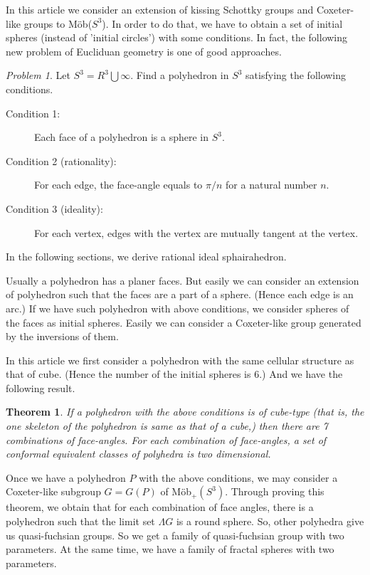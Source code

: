 \documentclass[dvipdfmx]{interact}
\theoremstyle{plain}%
\newtheorem{theorem}{Theorem}[section]
\theoremstyle{definition}
\theoremstyle{remark}
\theoremstyle{problemstyle}
\newtheorem{problem}{Problem}[section] %
\begin{document}
In this article we consider an extension of kissing Schottky groups and
Coxeter-like groups to M\"ob($S^3$). In order to do that, we have to
obtain a set of initial spheres (instead of 'initial circles') with some
conditions. In fact, the following new problem of Eucliduan geometry is
one of good approaches.

\begin{problem}
 Let $S^3 = R^3 \bigcup {\infty}$. Find a polyhedron in $S^3$ satisfying
 the following conditions.
 \begin{description}
  \item[Condition 1:] Each face of a polyhedron is a sphere in $S^3$.
  \item[Condition 2 (rationality):] For each edge, the face-angle equals to $\pi/n$
             for a natural number $n$.
  \item[Condition 3 (ideality):] For each vertex, edges with the vertex are
             mutually tangent at the vertex.
 \end{description}
\end{problem}

In the following sections, we derive rational ideal sphairahedron.

Usually a polyhedron has a planer faces. But easily we can consider an
extension of polyhedron such that the faces are a part of a
sphere. (Hence each edge is an arc.) If we have such polyhedron with
above conditions, we consider spheres of the faces as initial
spheres. Easily we can consider a Coxeter-like group generated by the
inversions of them.

In this article we first consider a polyhedron with the same cellular
structure as that of cube. (Hence the number of the initial spheres is
6.) And we have the following result.

\begin{theorem}\label{main}
 If a polyhedron with the above conditions is of cube-type (that is,
 the one skeleton of the polyhedron is same as that of a cube,) then
 there are 7 combinations of face-angles. For each combination of
 face-angles, a set of conformal equivalent classes of polyhedra is two
 dimensional.
\end{theorem}

Once we have a polyhedron $P$ with the above conditions, we may consider
a Coxeter-like subgroup $G=G(P)$ of M\"ob$_+(S^3)$. Through proving this
theorem, we obtain that for each combination of face angles, there is a
polyhedron such that the limit set $\Lambda{G}$ is a round sphere. So,
other polyhedra give us quasi-fuchsian groups. So we get a family of
quasi-fuchsian group with two parameters. At the same time, we have a
family of fractal spheres with two parameters.
\end{document}
